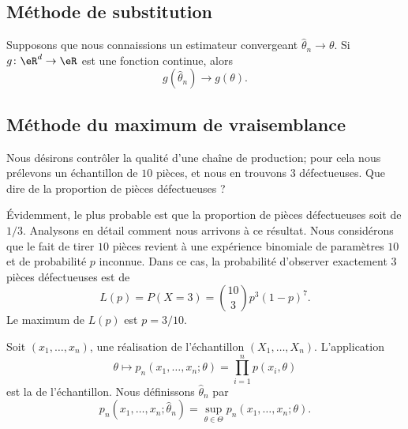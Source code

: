 \subsection{Méthode de substitution}

Supposons que nous connaissions un estimateur convergeant \( \hat\theta_n\to\theta\). Si \( g\colon \eR^d\to \eR\) est une fonction continue, alors
\begin{equation}
    g(\hat\theta_n)\to g(\theta).
\end{equation}

\subsection{Méthode du maximum de vraisemblance}

\begin{example}     \label{ExVrasMaxLp}
    Nous désirons contrôler la qualité d'une chaîne de production; pour cela nous prélevons un échantillon de \( 10\) pièces, et nous en trouvons \( 3\) défectueuses. Que dire de la proportion de pièces défectueuses ?

    Évidemment, le plus probable est que la proportion de pièces défectueuses soit de \( 1/3\). Analysons en détail comment nous arrivons à ce résultat. Nous considérons que le fait de tirer \( 10\) pièces revient à une expérience binomiale de paramètres \( 10\) et de probabilité \( p\) inconnue. Dans ce cas, la probabilité d'observer exactement \( 3\) pièces défectueuses est de 
    \begin{equation}
        L(p)=P(X=3)={10\choose 3}p^3(1-p)^{7}.
    \end{equation}
    Le maximum de \( L(p)\) est \( p=3/10\).

    \newcommand{\CaptionFigMaxVraissLp}{La fonction de vraisemblance de l'exemple \ref{ExVrasMaxLp}.}
    
\end{example}

Soit \( (x_1,\ldots,x_n)\), une réalisation de l'échantillon \( (X_1,\ldots,X_n)\). L'application
\begin{equation}
    \theta\mapsto p_n(x_1,\ldots,x_n;\theta)=\prod_{i=1}^np(x_i,\theta)
\end{equation}
est la  de l'échantillon. Nous définissons \( \hat\theta_n\) par
\begin{equation}
    p_n(x_1,\dots,x_n;\hat\theta_n)=\sup_{\theta\in\Theta}p_n(x_1,\ldots,x_n;\theta).
\end{equation}

